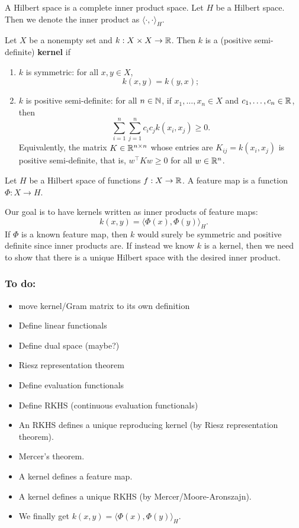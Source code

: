 \begin{definition}
    A Hilbert space is a complete inner product space.
    Let \(H\) be a Hilbert space.
    Then we denote the inner product as \(\langle \cdot, \cdot \rangle_H\).
\end{definition}

\begin{definition}[kernel]
    Let \(X\) be a nonempty set and \(k : X \times X \to \mathbb{R}\).
    Then \(k\) is a (positive semi-definite) \textbf{kernel} if
    \begin{enumerate}
        \item \(k\) is symmetric: for all \(x,y \in X\),
        \[k(x,y) = k(y,x);\]
        \item \(k\) is positive semi-definite: for all \(n \in \mathbb{N}\), if \(x_1, \dots, x_n \in X\) and \(c_1, \dots, c_n \in \mathbb{R}\), then
        \[\sum_{i=1}^{n}\sum_{j=1}^{n} c_i c_j k(x_i, x_j) \geq 0.\]
        Equivalently, the matrix \(K \in \mathbb{R}^{n \times n}\) whose entries are \(K_{ij} = k(x_i, x_j)\) is positive semi-definite, that is, \(w^\top K w \geq 0\) for all \(w \in \mathbb{R}^n\).
    \end{enumerate}
\end{definition}

\begin{definition}
    \cite{rudin2023notes}
    Let \(H\) be a Hilbert space of functions \(f : X \to \mathbb{R}\).
    A feature map is a function \(\Phi : X \to H\).
\end{definition}

Our goal is to have kernels written as inner products of feature maps:
\[k(x,y) = \langle \Phi(x), \Phi(y) \rangle_H.\]
If \(\Phi\) is a known feature map, then \(k\) would surely be symmetric and positive definite since inner products are.
If instead we know \(k\) is a kernel, then we need to show that there is a unique Hilbert space with the desired inner product.

\subsubsection*{To do:}
\begin{itemize}
    \item move kernel/Gram matrix to its own definition
    \item Define linear functionals
    \item Define dual space (maybe?)
    \item Riesz representation theorem
    \item Define evaluation functionals
    \item Define RKHS (continuous evaluation functionals)
    \item An RKHS defines a unique reproducing kernel (by Riesz representation theorem).
    \item Mercer's theorem.
    \item A kernel defines a feature map.
    \item A kernel defines a unique RKHS (by Mercer/Moore-Aronszajn).
    \item We finally get \(k(x,y) = \langle \Phi(x), \Phi(y) \rangle_H\).
\end{itemize}

